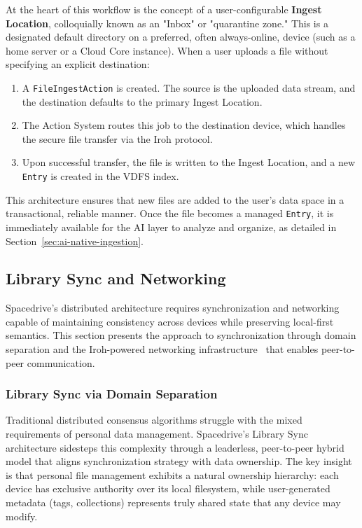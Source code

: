\documentclass[sigconf]{acmart}
\begin{document}
At the heart of this workflow is the concept of a user-configurable \textbf{Ingest Location}, colloquially known as an "Inbox" or "quarantine zone." This is a designated default directory on a preferred, often always-online, device (such as a home server or a Cloud Core instance). When a user uploads a file without specifying an explicit destination:

\begin{enumerate}[noitemsep, topsep=0pt]
    \item A \texttt{FileIngestAction} is created. The source is the uploaded data stream, and the destination defaults to the primary Ingest Location.
    \item The Action System routes this job to the destination device, which handles the secure file transfer via the Iroh protocol.
    \item Upon successful transfer, the file is written to the Ingest Location, and a new \texttt{Entry} is created in the VDFS index.
\end{enumerate}

This architecture ensures that new files are added to the user's data space in a transactional, reliable manner. Once the file becomes a managed \texttt{Entry}, it is immediately available for the AI layer to analyze and organize, as detailed in Section~\ref{sec:ai-native-ingestion}.

\subsection{Library Sync and Networking}
\label{sec:sync-networking}

Spacedrive's distributed architecture requires synchronization and networking capable of maintaining consistency across devices while preserving local-first semantics. This section presents the approach to synchronization through domain separation and the Iroh-powered networking infrastructure~\cite{iroh_networking} that enables peer-to-peer communication.

\subsubsection{Library Sync via Domain Separation}
\label{sec:library-sync}

Traditional distributed consensus algorithms struggle with the mixed requirements of personal data management. Spacedrive's Library Sync architecture sidesteps this complexity through a leaderless, peer-to-peer hybrid model that aligns synchronization strategy with data ownership. The key insight is that personal file management exhibits a natural ownership hierarchy: each device has exclusive authority over its local filesystem, while user-generated metadata (tags, collections) represents truly shared state that any device may modify.
\end{document}
